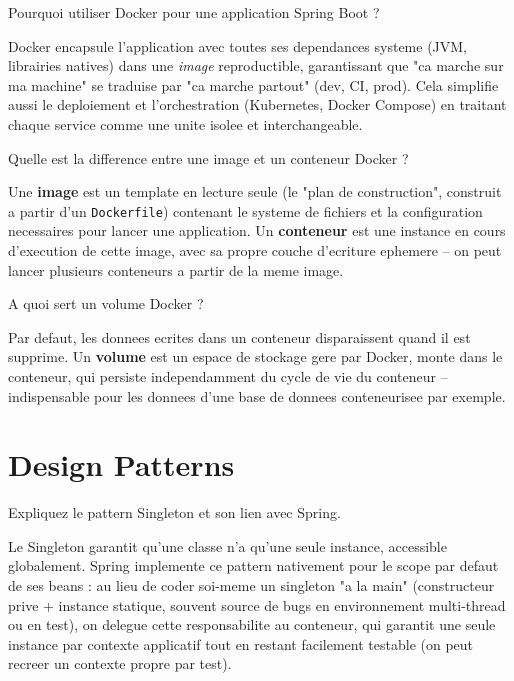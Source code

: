 \documentclass[11pt,a4paper]{article}
\begin{document}
\begin{question} Pourquoi utiliser Docker pour une application Spring Boot ?
\end{question}
\begin{reponse}
Docker encapsule l'application avec toutes ses dependances systeme (JVM, librairies natives) dans une \emph{image} reproductible, garantissant que "ca marche sur ma machine" se traduise par "ca marche partout" (dev, CI, prod). Cela simplifie aussi le deploiement et l'orchestration (Kubernetes, Docker Compose) en traitant chaque service comme une unite isolee et interchangeable.
\end{reponse}

\begin{question} Quelle est la difference entre une image et un conteneur Docker ?
\end{question}
\begin{reponse}
Une \textbf{image} est un template en lecture seule (le "plan de construction", construit a partir d'un \texttt{Dockerfile}) contenant le systeme de fichiers et la configuration necessaires pour lancer une application. Un \textbf{conteneur} est une instance en cours d'execution de cette image, avec sa propre couche d'ecriture ephemere -- on peut lancer plusieurs conteneurs a partir de la meme image.
\end{reponse}

\begin{question} A quoi sert un volume Docker ?
\end{question}
\begin{reponse}
Par defaut, les donnees ecrites dans un conteneur disparaissent quand il est supprime. Un \textbf{volume} est un espace de stockage gere par Docker, monte dans le conteneur, qui persiste independamment du cycle de vie du conteneur -- indispensable pour les donnees d'une base de donnees conteneurisee par exemple.
\end{reponse}

\newpage
\section{Design Patterns}

\begin{question} Expliquez le pattern Singleton et son lien avec Spring.
\end{question}
\begin{reponse}
Le Singleton garantit qu'une classe n'a qu'une seule instance, accessible globalement. Spring implemente ce pattern nativement pour le scope par defaut de ses beans : au lieu de coder soi-meme un singleton "a la main" (constructeur prive + instance statique, souvent source de bugs en environnement multi-thread ou en test), on delegue cette responsabilite au conteneur, qui garantit une seule instance par contexte applicatif tout en restant facilement testable (on peut recreer un contexte propre par test).
\end{reponse}
\end{document}
